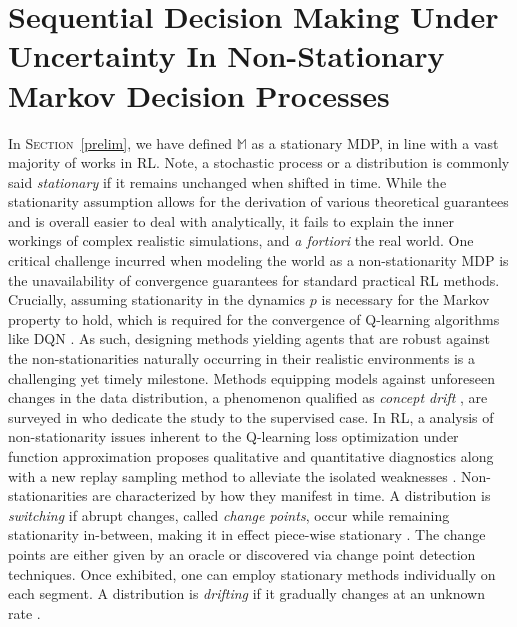 \section[%
Sequential Decision Making Under Uncertainty In Non-Stationary MDPs]{%
Sequential Decision Making Under Uncertainty In Non-Stationary Markov Decision Processes}
\label{nsmdps}
In \textsc{Section}~\ref{prelim}, we have defined $\mathbb{M}$ as a stationary MDP,
in line with a vast majority of works in RL.
Note, a stochastic process or a distribution is commonly said \emph{stationary} if
it remains unchanged when shifted in time.
While the stationarity assumption allows for the derivation of various theoretical guarantees
and is overall easier to deal with analytically,
it fails to explain the inner workings of complex realistic simulations,
and \textit{a fortiori} the real world.
One critical challenge incurred when modeling the world as a non-stationarity MDP is the
unavailability of convergence guarantees for standard practical RL methods.
Crucially, assuming stationarity in the dynamics $p$
is necessary for the Markov property to hold,
which is required for the convergence of Q-learning \cite{Watkins1989-ir}
algorithms \cite{Abdallah2016-pd}
like DQN \cite{Mnih2013-rb,Mnih2015-iy}.
As such, designing methods yielding agents that are robust against the non-stationarities
naturally occurring in their realistic environments
is a challenging yet timely milestone.
Methods equipping models against unforeseen changes in the data distribution,
a phenomenon qualified as \emph{concept drift} \cite{Schlimmer1986-nj},
are surveyed in \cite{Gama2014-wv} who dedicate the study to the supervised case.
In RL, a analysis of non-stationarity issues inherent to the Q-learning loss optimization
under function approximation \cite{Sutton1999-ii}
proposes qualitative and quantitative diagnostics along
with a new replay sampling method to alleviate the isolated weaknesses \cite{Fu2019-kb}.
Non-stationarities are characterized by how they manifest in time.
A distribution is \emph{switching} if abrupt changes, called \emph{change points},
occur while remaining stationarity
in-between, making it in effect piece-wise stationary
\cite{Da_Silva2006-gj,Jaksch2010-bf,Garivier2011-ax,Abdallah2016-pd,Gajane2018-ee,
Padakandla2019-mb,Auer2019-xz}.
The change points are either given by an oracle or discovered via change point detection
techniques.
Once exhibited, one can employ stationary methods individually on each segment.
A distribution is \emph{drifting} if it gradually changes at an unknown rate
\cite{Besbes2014-hm,Anava2016-qk,Luo2018-ib,Ortner2019-pw,Chen2019-gt,
Cheung2019-yq,Cheung2019-cu,Russac2019-da}.
